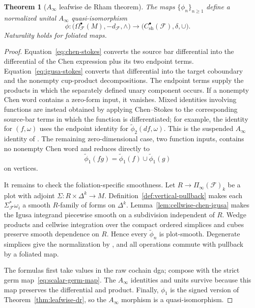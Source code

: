 \documentclass[12pt]{amsart}
\newtheorem{thm}{Theorem}[section]
\theoremstyle{definition}
\theoremstyle{remark}
\numberwithin{equation}{section}
\newcommand{\CF}{{\mathcal F}}
\newcommand{\1}{{\mathbb{1}}}
\begin{document}
\begin{thm}[$A_{\infty}$ leafwise de Rham theorem]
\label{thm:ainfty-dr}
The maps $\{\phi_n\}_{n\geq1}$ define a normalized unital
$A_{\infty}$ quasi-isomorphism
\[
 \phi:
 \bigl(\Omega^\bullet_{\CF}(M),-d_{\CF},\wedge\bigr)
 \longrightarrow
 \bigl(C^\bullet_{\mathrm{sh}}(\CF),\delta,\cup\bigr).
\]
Naturality holds for foliated maps.
\end{thm}

\begin{proof}
Equation~\eqref{eq:chen-stokes} converts the source bar differential
into the differential of the Chen expression plus its two endpoint
terms.  Equation~\eqref{eq:igusa-stokes} converts that differential
into the target coboundary and the nonempty cup-product
decompositions.  The endpoint terms supply the products in which the
separately defined unary component occurs.  If a nonempty Chen word
contains a zero-form input, it vanishes.  Mixed identities involving
functions are instead obtained by applying Chen--Stokes to the
corresponding source-bar terms in which the function is differentiated;
for example, the identity for $(f,\omega)$ uses the endpoint identity
for $\widetilde\phi_2(df,\omega)$.  This is the suspended
$A_\infty$ identity of \cite[Theorem 3.25]{AS12}.  The remaining
zero-dimensional case, two function inputs, contains no nonempty Chen
word and reduces directly to
\[
 \widetilde\phi_1(fg)
 =
 \widetilde\phi_1(f)\cup\widetilde\phi_1(g)
\]
on vertices.

It remains to check the foliation-specific smoothness.  Let
$R\to\Pi_\infty(\CF)_k$ be a plot with adjoint
$\Sigma:R\times\Delta^k\to M$.  Definition~\ref{def:vertical-pullback}
makes each $\Sigma_{\CF}^*\omega_i$ a smooth $R$-family of forms on
$\Delta^k$.  Lemma~\ref{lem:cellwise-chen-igusa} makes the Igusa
integrand piecewise smooth on a subdivision independent of $R$.
Wedge products and cellwise integration over the compact ordered
simplices and cubes preserve smooth dependence on $R$.  Hence every
$\widetilde\phi_n$ is plot-smooth.  Degenerate simplices give the
normalization by \cite[Proposition 3.26]{AS12}, and all operations
commute with pullback by a foliated map.

The formulas first take values in the raw cochain dga; compose with
the strict germ map~\eqref{eq:scalar-germ-map}.  The $A_\infty$
identities and units survive because this map preserves the
differential and product.  Finally, $\phi_1$ is the signed version of
Theorem~\ref{thm:leafwise-dr}, so the $A_\infty$ morphism is a
quasi-isomorphism.
\end{proof}
\end{document}
